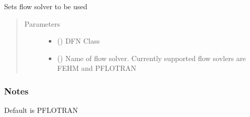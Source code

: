 \documentclass[letterpaper,10pt,english]{sphinxmanual}
\begin{document}
\begin{fulllineitems}
\label{\detokenize{pydfnworks:pydfnworks.dfnFlow.flow.set_flow_solver}}
Sets flow solver to be used
\begin{quote}\begin{description}
\item[{Parameters}] \leavevmode\begin{itemize}
\item {} 
 () \textendash{} DFN Class

\item {} 
 () \textendash{} Name of flow solver. Currently supported flow sovlers are FEHM and PFLOTRAN

\end{itemize}

\end{description}\end{quote}
\subsubsection*{Notes}

Default is PFLOTRAN

\end{fulllineitems}

\end{document}
